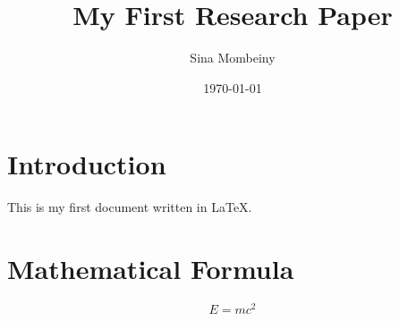 \documentclass{article}
\title{My First Research Paper}
\author{Sina Mombeiny}
\date{\today}
\begin{document}
\maketitle

\section{Introduction}

This is my first document written in LaTeX.

\section{Mathematical Formula}

\[
E = mc^2
\]
\end{document}
